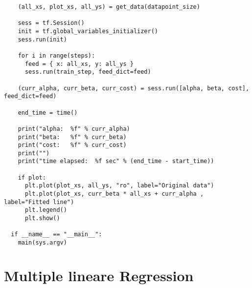 \begin{verbatim}
    (all_xs, plot_xs, all_ys) = get_data(datapoint_size)

    sess = tf.Session()
    init = tf.global_variables_initializer()
    sess.run(init)

    for i in range(steps):
      feed = { x: all_xs, y: all_ys }
      sess.run(train_step, feed_dict=feed)

    (curr_alpha, curr_beta, curr_cost) = sess.run([alpha, beta, cost], feed_dict=feed)

    end_time = time()

    print("alpha:  %f" % curr_alpha)
    print("beta:   %f" % curr_beta)
    print("cost:   %f" % curr_cost)
    print("")
    print("time elapsed:  %f sec" % (end_time - start_time))

    if plot:
      plt.plot(plot_xs, all_ys, "ro", label="Original data")
      plt.plot(plot_xs, curr_beta * all_xs + curr_alpha , label="Fitted line")
      plt.legend()
      plt.show()

  if __name__ == "__main__":
    main(sys.argv)
\end{verbatim}

\section{Multiple lineare Regression}
\label{appendix:C:2}

